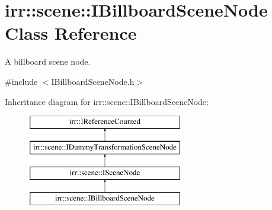 \hypertarget{classirr_1_1scene_1_1IBillboardSceneNode}{}\section{irr\+:\+:scene\+:\+:I\+Billboard\+Scene\+Node Class Reference}
\label{classirr_1_1scene_1_1IBillboardSceneNode}


A billboard scene node.  




{\ttfamily \#include $<$I\+Billboard\+Scene\+Node.\+h$>$}

Inheritance diagram for irr\+:\+:scene\+:\+:I\+Billboard\+Scene\+Node\+:\begin{figure}[H]
\begin{center}
\leavevmode
\includegraphics[height=4.000000cm]{classirr_1_1scene_1_1IBillboardSceneNode}
\end{center}
\end{figure}

